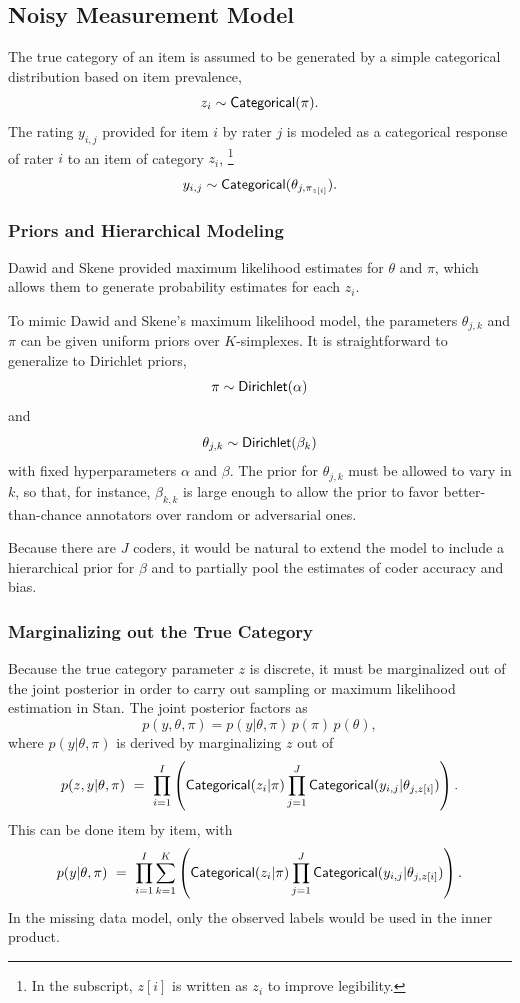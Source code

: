 \subsection{Noisy Measurement Model}

The true category of an item is assumed to be generated by a simple
categorical distribution based on item prevalence,
\[
z_i \sim \distro{Categorical}(\pi).
\]
%
The rating $y_{i, j}$ provided for item $i$ by rater $j$ is modeled as
a categorical response of rater $i$ to an item of category $z_i$,%
%
\footnote{In the subscript, $z[i]$ is written as $z_i$ to
  improve legibility.}
%
\[
y_{i, j} \sim \distro{Categorical}(\theta_{j,\pi_{z[i]}}).
\]

\subsubsection{Priors and Hierarchical Modeling}

Dawid and Skene provided maximum likelihood estimates for $\theta$ and
$\pi$, which allows them to generate probability estimates for each $z_i$.

To mimic Dawid and Skene's maximum likelihood model, the parameters
$\theta_{j,k}$ and $\pi$ can be given uniform priors over
$K$-simplexes.  It is straightforward to generalize to Dirichlet
priors,
\[
\pi \sim \distro{Dirichlet}(\alpha)
\]
and
\[
\theta_{j,k} \sim \distro{Dirichlet}(\beta_k)
\]
with fixed hyperparameters $\alpha$ and $\beta$.  The prior for
$\theta_{j,k}$ must be allowed to vary in $k$, so that, for instance,
$\beta_{k,k}$ is large enough to allow the prior to favor
better-than-chance annotators over random or adversarial ones.

Because there are $J$ coders, it would be natural to extend the model
to include a hierarchical prior for $\beta$ and to partially pool the
estimates of coder accuracy and bias.

\subsubsection{Marginalizing out the True Category}

Because the true category parameter $z$ is discrete, it must be
marginalized out of the joint posterior in order to carry out sampling
or maximum likelihood estimation in Stan. The joint posterior factors
as
\[
p(y, \theta, \pi) = p(y | \theta,\pi) \, p(\pi) \, p(\theta),
\]
where $p(y | \theta,\pi)$ is derived by marginalizing $z$ out of
%
\[
p(z, y | \theta, \pi)
\ = \
\prod_{i=1}^I \left( \distro{Categorical}(z_i | \pi)
                     \prod_{j=1}^J
                     \distro{Categorical}(y_{i, j}|\theta_{j, z[i]})
              \right).
\]
%
This can be done item by item, with
\[
p(y | \theta, \pi)
\ = \
\prod_{i=1}^I \sum_{k=1}^K  
  \left( \distro{Categorical}(z_i | \pi)
         \prod_{j=1}^J
         \distro{Categorical}(y_{i, j}|\theta_{j, z[i]})
  \right).
\]            
%
In the missing data model, only the observed labels would be used in
the inner product.

